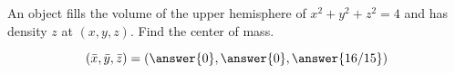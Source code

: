 \documentclass{ximera}
\author{David Guichard \and Neal Koblitz \and H. Jerome Keisler \and Albert Scheller \and Barry Balof \and Mike Wills \and Matthew Carr}
\begin{document}
\begin{exercise}




An object fills the volume of the upper hemisphere of $x^2+y^2+z^2=4$ and has density $z$ at $(x,y,z)$. Find the center of mass.\begin{prompt}
\[
\left(\bar{x},\bar{y},\bar{z}\right)=\left(\answer{0},\answer{0},\answer{16/15}\right)
\]
\end{prompt}



\end{exercise}
\end{document}
